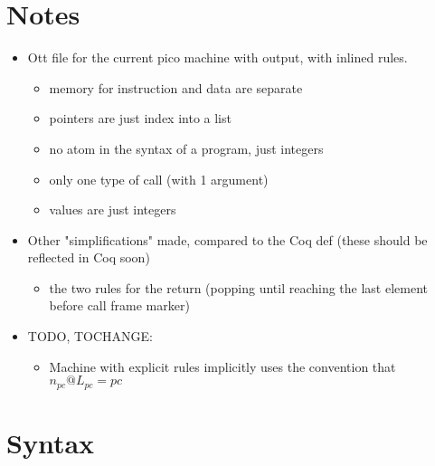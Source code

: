 \documentclass{article}
\begin{document}
\section*{Notes}

\begin{itemize}
\item Ott file for the current pico machine with output, with inlined rules.
  \begin{itemize}
  \item memory for instruction and data are separate
  \item pointers are just index into a list
  \item no atom in the syntax of a program, just integers
  \item only one type of call (with 1 argument)
  \item values are just integers
  \end{itemize}
\item Other "simplifications" made, compared to the Coq def
  (these should be reflected in Coq soon)
  \begin{itemize}
    \item the two rules for the return (popping until reaching the
      last element before call frame marker)
  \end{itemize}
\item TODO, TOCHANGE: 
  \begin{itemize}
    \item Machine with explicit rules implicitly uses the convention that 
      $n_{pc}@L_{pc} = pc$
  \end{itemize}
\end{itemize}

\section*{Syntax}

\ottmetavars\\[3ex]

\ottgrammartabular{
\ottn\ottinterrule
\ottL\ottinterrule
\otta\ottinterrule
\ottinstr\ottinterrule
\ottS\ottinterrule
}

\end{document}
